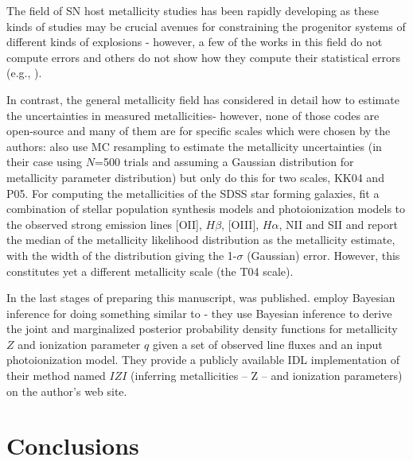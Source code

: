 \documentclass{emulateapj}
\begin{document}


The field of SN host metallicity studies has been rapidly developing as these kinds of studies may be crucial avenues for constraining the progenitor systems of different kinds of explosions - however, a few of the works in this field do not compute errors and others do not show how they compute their statistical errors  (e.g., \citealt{anderson10,leloudas11,sanders12,leloudas14}). %

In contrast, the general metallicity field has considered in detail how to estimate the uncertainties in measured metallicities- however, none of those codes are open-source and many of them are for specific scales which were chosen by the authors:  \citet{moustakas10} also use MC resampling to estimate the metallicity uncertainties (in their case using $N$=500 trials and assuming a Gaussian distribution for metallicity parameter distribution) but only do this for two scales, KK04 and P05. For computing the metallicities of the SDSS star forming galaxies, \citet{tremonti04} fit a combination of stellar population synthesis models and  photoionization models to the observed strong emission lines [OII], $H\beta$, [OIII], $H\alpha$, NII and SII and report the median of the metallicity likelihood distribution as the metallicity estimate, with the width of the distribution giving the 1-$\sigma$ (Gaussian) error. However, this constitutes yet a different metallicity scale (the T04 scale).

In the last stages of preparing this manuscript, \citet{blanc15} was published.  \citet{blanc15} employ Bayesian inference for doing something similar to \citet{tremonti04} - they use Bayesian inference to derive the joint and marginalized posterior probability density functions for metallicity $Z$ and ionization parameter $q$ given a set of observed line fluxes and an input photoionization model. They provide a publicly available IDL implementation of their method named $IZI$ (inferring metallicities -- Z -- and ionization parameters) on the author's web site.


\section{Conclusions}\label{conclusions_sec}
\end{document}
